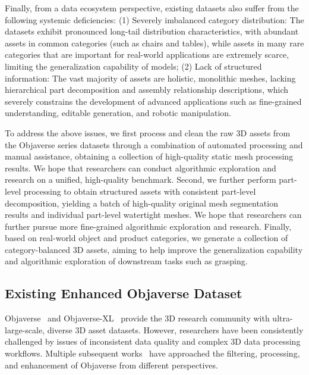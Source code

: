 \documentclass{article} %
\begin{document}
Finally, from a data ecosystem perspective, existing datasets also suffer from the following systemic deficiencies: (1) Severely imbalanced category distribution: The datasets exhibit pronounced long-tail distribution characteristics, with abundant assets in common categories (such as chairs and tables), while assets in many rare categories that are important for real-world applications are extremely scarce, limiting the generalization capability of models; (2) Lack of structured information: The vast majority of assets are holistic, monolithic meshes, lacking hierarchical part decomposition and assembly relationship descriptions, which severely constrains the development of advanced applications such as fine-grained understanding, editable generation, and robotic manipulation.

To address the above issues, we first process and clean the raw 3D assets from the Objaverse series datasets through a combination of automated processing and manual assistance, obtaining a collection of high-quality static mesh processing results. We hope that researchers can conduct algorithmic exploration and research on a unified, high-quality benchmark. Second, we further perform part-level processing to obtain structured assets with consistent part-level decomposition, yielding a batch of high-quality original mesh segmentation results and individual part-level watertight meshes. We hope that researchers can further pursue more fine-grained algorithmic exploration and research. Finally, based on real-world object and product categories, we generate a collection of category-balanced 3D assets, aiming to help improve the generalization capability and algorithmic exploration of downstream tasks such as grasping.

\subsection{Existing Enhanced Objaverse Dataset}




Objaverse~\cite{objaverse} and Objaverse-XL~\cite{objaverseXL} provide the 3D research community with ultra-large-scale, diverse 3D asset datasets. However, researchers have been consistently challenged by issues of inconsistent data quality and complex 3D data processing workflows. Multiple subsequent works~\cite{lin2025objaverseplusplus, lu2025objaverseoa, jin2025canoobjdataset, qian2024objaversemix} have approached the filtering, processing, and enhancement of Objaverse from different perspectives.
\end{document}
